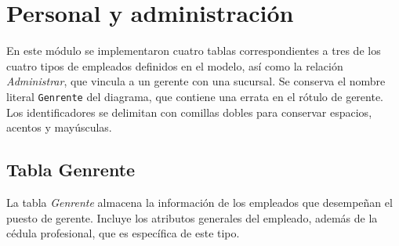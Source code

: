 
\section{Personal y administración}

En este módulo se implementaron cuatro tablas correspondientes a tres de los cuatro tipos de empleados definidos en el modelo, así como la relación \textit{Administrar}, que vincula a un gerente con una sucursal. Se conserva el nombre literal \texttt{Genrente} del diagrama, que contiene una errata en el rótulo de gerente. Los identificadores se delimitan con comillas dobles para conservar espacios, acentos y mayúsculas.

\subsection{Tabla Genrente}

La tabla \textit{Genrente} almacena la información de los empleados que desempeñan el puesto de gerente. Incluye los atributos generales del empleado, además de la cédula profesional, que es específica de este tipo.

